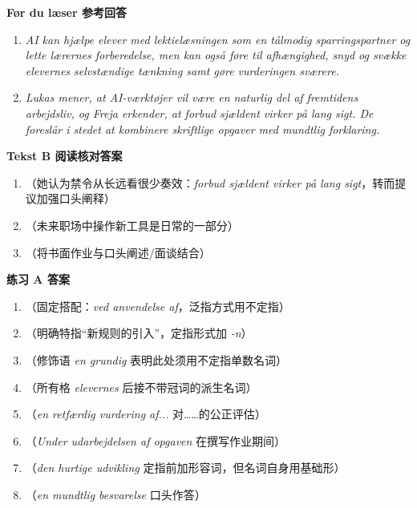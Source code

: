 \begin{answerbox}
\textbf{Før du læser 参考回答}
\begin{enumerate}
  \item \textit{AI kan hjælpe elever med lektielæsningen som en tålmodig sparringspartner og lette lærernes forberedelse, men kan også føre til afhængighed, snyd og svække elevernes selvstændige tænkning samt gøre vurderingen sværere.}
  \item \textit{Lukas mener, at AI-værktøjer vil være en naturlig del af fremtidens arbejdsliv, og Freja erkender, at forbud sjældent virker på lang sigt. De foreslår i stedet at kombinere skriftlige opgaver med mundtlig forklaring.}
\end{enumerate}

\textbf{Tekst B 阅读核对答案}
\begin{enumerate}
  \item {}（她认为禁令从长远看很少奏效：\textit{forbud sjældent virker på lang sigt}，转而提议加强口头阐释）
  \item {}（未来职场中操作新工具是日常的一部分）
  \item {}（将书面作业与口头阐述/面谈结合）
\end{enumerate}

\textbf{练习 A 答案}
\begin{enumerate}
  \item {}（固定搭配：\textit{ved anvendelse af}，泛指方式用不定指）
  \item {}（明确特指“新规则的引入”，定指形式加 \textit{-n}）
  \item {}（修饰语 \textit{en grundig} 表明此处须用不定指单数名词）
  \item {}（所有格 \textit{elevernes} 后接不带冠词的派生名词）
  \item {}（\textit{en retfærdig vurdering af...} 对……的公正评估）
  \item {}（\textit{Under udarbejdelsen af opgaven} 在撰写作业期间）
  \item {}（\textit{den hurtige udvikling} 定指前加形容词，但名词自身用基础形）
  \item {}（\textit{en mundtlig besvarelse} 口头作答）
\end{enumerate}


\end{answerbox}
